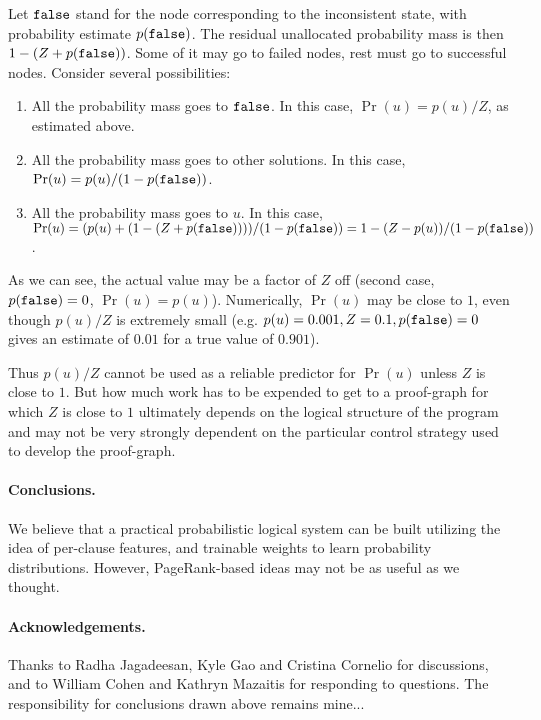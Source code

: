 \documentclass{article} %
\begin{document}
Let $\mbox{\tt false}$ stand for the node corresponding to the inconsistent state, with probability estimate $p(\mbox{\tt false})$. The residual unallocated probability mass is then $1-(Z+p(\mbox{\tt false}))$. Some of it may go to failed nodes, rest must go to successful nodes. Consider several possibilities:
\begin{enumerate}
\item All the probability mass goes to $\mbox{\tt false}$. In this case, $\Pr(u)=p(u)/Z$, as estimated above.
\item All the probability mass goes to other solutions. In this case, $\Pr(u)=p(u)/(1-p(\mbox{\tt false}))$. 
\item All the probability mass goes to $u$. In this case,
$\Pr(u)=(p(u) + (1-(Z+p(\mbox{\tt false}))))/(1-p(\mbox{\tt false})) = 1-(Z-p(u))/(1-p(\mbox{\tt false}))$.
\end{enumerate}
As we can see, the actual value may be a factor of $Z$ off (second case, $p(\mbox{\tt false})=0$, $\Pr(u)=p(u)$). Numerically, $\Pr(u)$ may be close to $1$, even though $p(u)/Z$ is extremely small (e.g.{} $p(u)=0.001, Z=0.1, p(\mbox{\tt false})=0$  gives an estimate of $0.01$ for a true value of $0.901$). 

Thus $p(u)/Z$ cannot be used as a reliable predictor for $\Pr(u)$ unless $Z$ is close to $1$. But how much work has to be expended to get to a proof-graph for which $Z$ is close to $1$ ultimately depends on the logical structure of the program and may not be very strongly dependent on the particular control strategy used to develop the proof-graph.

\paragraph{Conclusions.} 
We believe that a practical probabilistic logical system can be built utilizing the idea of per-clause features, and trainable weights to learn probability distributions. However, PageRank-based ideas may not be as useful as we thought.

\paragraph{Acknowledgements.} 
Thanks to Radha Jagadeesan, Kyle Gao and Cristina Cornelio for discussions, and to William Cohen and Kathryn Mazaitis for responding to questions. The responsibility for conclusions drawn above remains mine...


\end{document}
